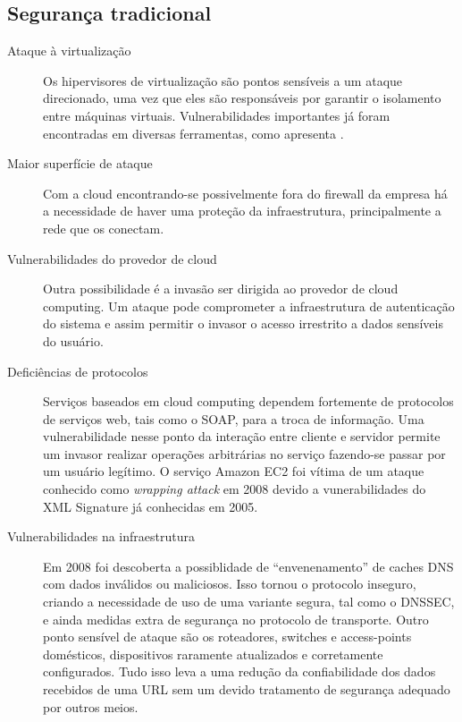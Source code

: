 \documentclass[brazil,12pt]{article}
\begin{document}
\subsection{Segurança tradicional}
\begin{description}
  \item[Ataque à virtualização] Os hipervisores de virtualização são pontos
  sensíveis a um ataque direcionado, uma vez que eles são responsáveis por
  garantir o isolamento entre máquinas virtuais. Vulnerabilidades importantes já
  foram encontradas em diversas ferramentas, como apresenta 
  \cite{controlling-data-in-cloud}.
  \item[Maior superfície de ataque] Com a cloud encontrando-se possivelmente
  fora do firewall da empresa há a necessidade de haver uma proteção da
  infraestrutura, principalmente a rede que os conectam.
  \item[Vulnerabilidades do provedor de cloud] Outra possibilidade é a invasão
  ser dirigida ao provedor de cloud computing. Um ataque pode comprometer a
  infraestrutura de autenticação do sistema e assim permitir o invasor o acesso
  irrestrito a dados sensíveis do usuário.
  \item[Deficiências de protocolos] Serviços baseados em cloud computing
  dependem fortemente de protocolos de serviços web, tais como o SOAP, para a
  troca de informação. Uma vulnerabilidade nesse ponto da interação entre
  cliente e servidor permite um invasor realizar operações arbitrárias no
  serviço fazendo-se passar por um usuário legítimo. O serviço Amazon EC2 foi
  vítima de um ataque conhecido como \emph{wrapping attack} em 2008 devido a
  vunerabilidades do XML Signature já conhecidas em 2005.
  \cite{technical-security-issues}
  \item[Vulnerabilidades na infraestrutura] Em 2008 foi descoberta a
  possiblidade de ``envenenamento'' de caches DNS com dados inválidos ou
  maliciosos. Isso tornou o protocolo inseguro, criando a necessidade de uso de
  uma variante segura, tal como o DNSSEC, e ainda medidas extra de segurança no
  protocolo de transporte. Outro ponto sensível de ataque são os roteadores,
  switches e access-points domésticos, dispositivos raramente atualizados e
  corretamente configurados. Tudo isso leva a uma redução da confiabilidade dos
  dados recebidos de uma URL sem um devido tratamento de segurança adequado por
  outros meios.
\end{description}
\end{document}
